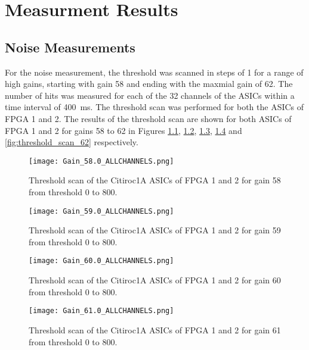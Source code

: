 \chapter{Measurment Results}\label{cha:results}
\noindent
\section{Noise Measurements}
For the noise measurement, the threshold was scanned in steps of 1 for a range of high gains,
starting with gain 58 and ending with the maxmial gain of 62.
\newline
The number of hits was measured for each of the 32 channels of the ASICs within a time interval of \SI{400}{\milli\second}.
The threshold scan was performed for both the ASICs of FPGA 1 and 2.
\newline
The results of the threshold scan are shown for both ASICs of FPGA 1 and 2 for gains 58 to 62 in Figures \ref{fig:threshold_scan_58}, \ref{fig:threshold_scan_59}, \ref{fig:threshold_scan_60}, \ref{fig:threshold_scan_61} and \ref{fig:threshold_scan_62} respectively.

    \begin{figure}[H]
        \centering
        \texttt{[image: Gain\_58.0\_ALLCHANNELS.png]}
        \caption{Threshold scan of the Citiroc1A ASICs of FPGA 1 and 2 for gain 58 from threshold 0 to 800.}
        \label{fig:threshold_scan_58}
    \end{figure}
    
    \begin{figure}[H]
        \centering
        \texttt{[image: Gain\_59.0\_ALLCHANNELS.png]}
        \caption{Threshold scan of the Citiroc1A ASICs of FPGA 1 and 2 for gain 59 from threshold 0 to 800.}
        \label{fig:threshold_scan_59}
    \end{figure}
    
    \begin{figure}[H]
        \centering
        \texttt{[image: Gain\_60.0\_ALLCHANNELS.png]}
        \caption{Threshold scan of the Citiroc1A ASICs of FPGA 1 and 2 for gain 60 from threshold 0 to 800.}
        \label{fig:threshold_scan_60}
    \end{figure}
    
    \begin{figure}[H]
        \centering
        \texttt{[image: Gain\_61.0\_ALLCHANNELS.png]}
        \caption{Threshold scan of the Citiroc1A ASICs of FPGA 1 and 2 for gain 61 from threshold 0 to 800.}
        \label{fig:threshold_scan_61}
    \end{figure}
    
